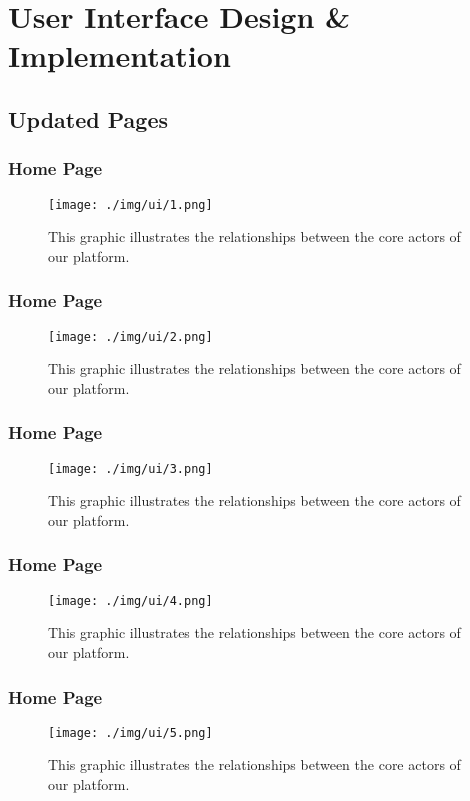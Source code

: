 \chapter{User Interface Design \& Implementation}

\section{Updated Pages}

\subsection{Home Page}
\begin{figure}[H]
\centering
\texttt{[image: ./img/ui/1.png]}
\caption{This graphic illustrates the relationships between the core actors of our platform.}
\end{figure}

\subsection{Home Page}
\begin{figure}[H]
\centering
\texttt{[image: ./img/ui/2.png]}
\caption{This graphic illustrates the relationships between the core actors of our platform.}
\end{figure}

\subsection{Home Page}
\begin{figure}[H]
\centering
\texttt{[image: ./img/ui/3.png]}
\caption{This graphic illustrates the relationships between the core actors of our platform.}
\end{figure}

\subsection{Home Page}
\begin{figure}[H]
\centering
\texttt{[image: ./img/ui/4.png]}
\caption{This graphic illustrates the relationships between the core actors of our platform.}
\end{figure}

\subsection{Home Page}
\begin{figure}[H]
\centering
\texttt{[image: ./img/ui/5.png]}
\caption{This graphic illustrates the relationships between the core actors of our platform.}
\end{figure}

